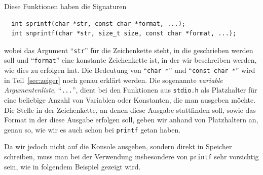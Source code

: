Diese Funktionen haben die Signaturen
\begin{lstlisting}
  int sprintf(char *str, const char *format, ...);
  int snprintf(char *str, size_t size, const char *format, ...);
\end{lstlisting}
wobei das Argument \enquote{\texttt{str}} für die Zeichenkette steht, in die geschrieben werden soll und \enquote{\texttt{format}} eine konstante Zeichenkette ist, in der wir beschreiben werden, wie dies zu erfolgen hat.
Die Bedeutung von \enquote{\texttt{char *}} und \enquote{\texttt{const char *}} wird in Teil~\ref{sec:zeiger} noch genau erklärt werden.
Die sogenannte \emph{variable Argumentenliste}, \enquote{\texttt{...}}, dient bei den Funktionen aus \texttt{stdio.h} als Platzhalter für eine beliebige Anzahl von Variablen oder Konstanten, die man ausgeben möchte.
Die Stelle in der Zeichenkette, an denen diese Ausgabe stattfinden soll, sowie das Format in der diese Ausgabe erfolgen soll, geben wir anhand von Platzhaltern an, genau so, wie wir es auch schon bei \texttt{printf} getan haben.

Da wir jedoch nicht auf die Konsole ausgeben, sondern direkt in Speicher schreiben, muss man bei der Verwendung insbesondere von \texttt{printf} sehr vorsichtig sein, wie in folgendem Beispiel gezeigt wird.

